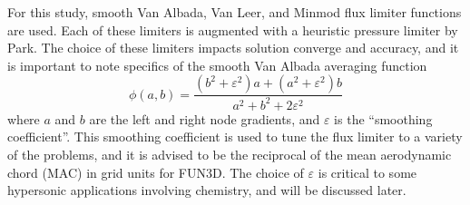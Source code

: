 For this study, smooth Van Albada\cite{van1997comparative}, Van
Leer\cite{vatsa2009calibration}, and Minmod\cite{roe1986characteristic} flux
limiter functions are used.  Each of these limiters is augmented with a
heuristic pressure limiter by Park\cite{park2008anisotropic}. The choice of
these limiters impacts solution converge and accuracy, and it is important to
note specifics of the smooth Van Albada averaging function
\begin{equation}
  \phi\left( a, b \right) =
  \frac{(b^2 + \varepsilon^2)a + (a^2 + \varepsilon^2)b}
  {a^2 + b^2 + 2\varepsilon^2}
  \label{van-albada-avg}
\end{equation}
where $a$ and $b$ are the left and right node gradients, and $\varepsilon$ is
the ``smoothing coefficient''.  This smoothing coefficient is used to tune the
flux limiter to a variety of the problems, and it is advised to be the
reciprocal of the mean aerodynamic chord (MAC) in grid units for
FUN3D\cite{biedron2016fun3d}.  The choice of $\varepsilon$ is critical to some
hypersonic applications involving chemistry, and will be discussed later.

